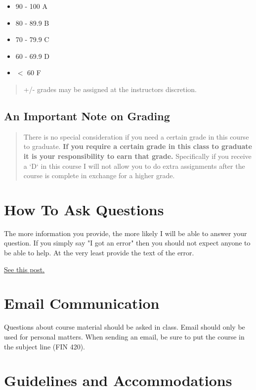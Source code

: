 \documentclass[11pt]{article}
\begin{document}
\begin{itemize}
\item 90 - 100 A
\item 80 - 89.9 B
\item 70 - 79.9 C
\item 60 - 69.9 D
\item \(<\) 60 F
\end{itemize}

\begin{quote}
+/- grades may be assigned at the instructors discretion.
\end{quote}
\subsection{An Important Note on Grading}
\label{sec:org0a04d52}

\begin{quote}
There is no special consideration if you need a certain grade in this course to graduate.  \textbf{\textbf{If you require a certain grade in this class to graduate it is your responsibility to earn that grade.}} Specifically if you receive a `D` in this course I will not allow you to do extra assignments after the course is complete in exchange for a higher grade. 
\end{quote}
\section{How To Ask Questions}
\label{sec:orga821069}

The more information you provide, the more likely I will be able to answer your question.  If you simply say "I got an error" then you should not expect anyone to be able to help.  At the very least provide the text of the error.

\href{https://stackoverflow.com/help/how-to-ask}{See this post.}  
\section{Email Communication}
\label{sec:org6ca1252}

Questions about course material should be asked in class.  Email should only be used for personal matters.  When sending an email, be sure to put the course in the subject line (FIN 420). 
\section{Guidelines and Accommodations}
\label{sec:orgc55b84a}
\end{document}

